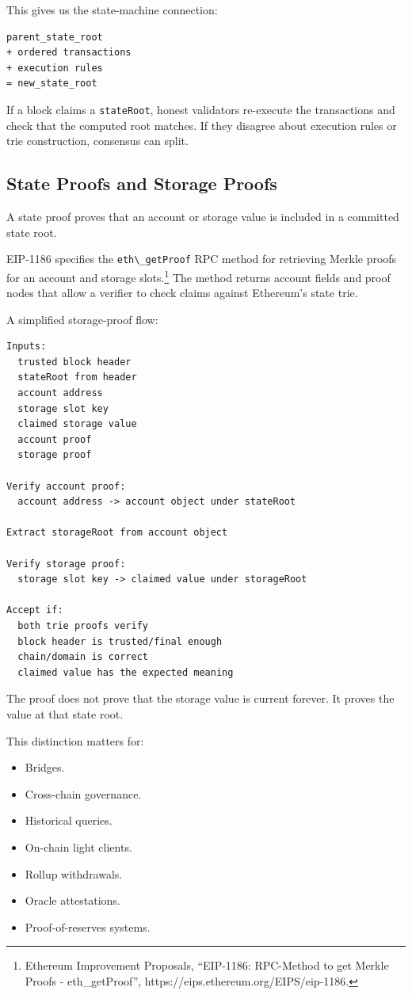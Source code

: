 This gives us the state-machine connection:

\begin{lstlisting}
parent_state_root
+ ordered transactions
+ execution rules
= new_state_root
\end{lstlisting}

If a block claims a \passthrough{\lstinline!stateRoot!}, honest
validators re-execute the transactions and check that the computed root
matches. If they disagree about execution rules or trie construction,
consensus can split.

\subsection{State Proofs and Storage Proofs}

A state proof proves that an account or storage value is included in a
committed state root.

EIP-1186 specifies the \passthrough{\lstinline!eth\_getProof!} RPC
method for retrieving Merkle proofs for an account and storage
slots.\footnote{Ethereum Improvement Proposals, ``EIP-1186: RPC-Method
  to get Merkle Proofs - eth\_getProof'',
  https://eips.ethereum.org/EIPS/eip-1186.} The method returns account
fields and proof nodes that allow a verifier to check claims against
Ethereum's state trie.

A simplified storage-proof flow:

\begin{lstlisting}
Inputs:
  trusted block header
  stateRoot from header
  account address
  storage slot key
  claimed storage value
  account proof
  storage proof

Verify account proof:
  account address -> account object under stateRoot

Extract storageRoot from account object

Verify storage proof:
  storage slot key -> claimed value under storageRoot

Accept if:
  both trie proofs verify
  block header is trusted/final enough
  chain/domain is correct
  claimed value has the expected meaning
\end{lstlisting}

The proof does not prove that the storage value is current forever. It
proves the value at that state root.

This distinction matters for:

\begin{itemize}
\tightlist
\item
  Bridges.
\item
  Cross-chain governance.
\item
  Historical queries.
\item
  On-chain light clients.
\item
  Rollup withdrawals.
\item
  Oracle attestations.
\item
  Proof-of-reserves systems.
\end{itemize}

